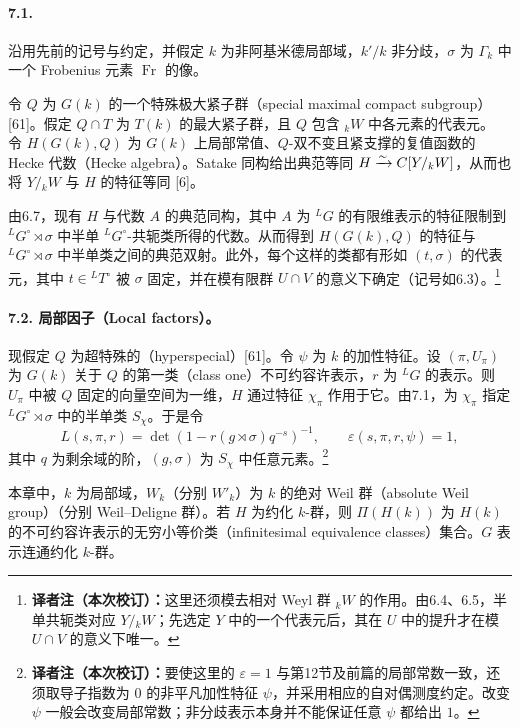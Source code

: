 \paragraph*{7.1.} 沿用先前的记号与约定，并假定 $k$ 为非阿基米德局部域，$k'/k$ 非分歧，$\sigma$ 为 $\Gamma_k$ 中一个 Frobenius 元素 $\operatorname{Fr}$ 的像。

令 $Q$ 为 $G(k)$ 的一个特殊极大紧子群（special maximal compact subgroup）[61]。假定 $Q\cap T$ 为 $T(k)$ 的最大紧子群，且 $Q$ 包含 ${}_kW$ 中各元素的代表元。
令 $H(G(k),Q)$ 为 $G(k)$ 上局部常值、$Q$-双不变且紧支撑的复值函数的 Hecke 代数（Hecke algebra）。Satake 同构给出典范等同 $H\xrightarrow{\sim}C[Y/{}_kW]$，从而也将 $Y/{}_kW$ 与 $H$ 的特征等同 [6]。

由6.7，现有 $H$ 与代数 $A$ 的典范同构，其中 $A$ 为 ${}^LG$ 的有限维表示的特征限制到 ${}^LG^\circ\rtimes\sigma$ 中半单 ${}^LG^\circ$-共轭类所得的代数。从而得到 $H(G(k),Q)$ 的特征与 ${}^LG^\circ\rtimes\sigma$ 中半单类之间的典范双射。此外，每个这样的类都有形如 $(t,\sigma)$ 的代表元，其中 $t\in{}^LT^\circ$ 被 $\sigma$ 固定，并在模有限群 $U\cap V$ 的意义下确定（记号如6.3）。\footnote{\textbf{译者注（本次校订）：}这里还须模去相对 Weyl 群 ${}_kW$ 的作用。由6.4、6.5，半单共轭类对应 $Y/{}_kW$；先选定 $Y$ 中的一个代表元后，其在 $U$ 中的提升才在模 $U\cap V$ 的意义下唯一。}

\paragraph*{7.2. 局部因子（Local factors）。}
现假定 $Q$ 为超特殊的（hyperspecial）[61]。令 $\psi$ 为 $k$ 的加性特征。设 $(\pi,U_\pi)$ 为 $G(k)$ 关于 $Q$ 的第一类（class one）不可约容许表示，$r$ 为 ${}^LG$ 的表示。则 $U_\pi$ 中被 $Q$ 固定的向量空间为一维，$H$ 通过特征 $\chi_\pi$ 作用于它。由7.1，为 $\chi_\pi$ 指定 ${}^LG^\circ\rtimes\sigma$ 中的半单类 $S_\chi$。于是令
\begin{equation}
 L(s,\pi,r)=\det(1-r(g\rtimes\sigma)q^{-s})^{-1},\qquad
 \varepsilon(s,\pi,r,\psi)=1,\tag{1}
\end{equation}
其中 $q$ 为剩余域的阶，$(g,\sigma)$ 为 $S_\chi$ 中任意元素。\footnote{\textbf{译者注（本次校订）：}要使这里的 $\varepsilon=1$ 与第12节及前篇的局部常数一致，还须取导子指数为 $0$ 的非平凡加性特征 $\psi$，并采用相应的自对偶测度约定。改变 $\psi$ 一般会改变局部常数；非分歧表示本身并不能保证任意 $\psi$ 都给出 $1$。}

本章中，$k$ 为局部域，$W_k$（分别 $W'_k$）为 $k$ 的绝对 Weil 群（absolute Weil group）（分别 Weil--Deligne 群）。若 $H$ 为约化 $k$-群，则 $\Pi(H(k))$ 为 $H(k)$ 的不可约容许表示的无穷小等价类（infinitesimal equivalence classes）集合。$G$ 表示连通约化 $k$-群。

